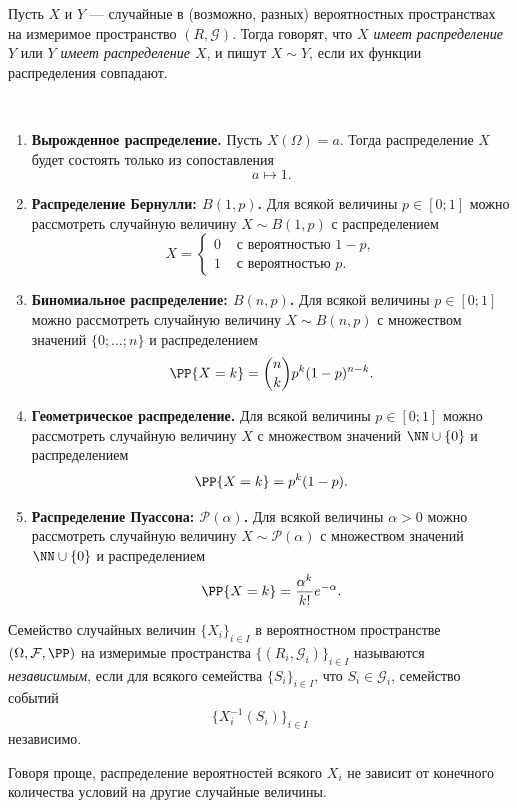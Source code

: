 \documentclass[12pt,a4paper]{article}
\begin{document}
    \begin{definition}
        Пусть $X$ и $Y$ --- случайные в (возможно, разных) вероятностных пространствах на измеримое пространство $(R, \mathcal{G})$. Тогда говорят, что \emph{$X$ имеет распределение $Y$} или \emph{$Y$ имеет распределение $X$}, и пишут $X \sim Y$, если их функции распределения совпадают.
    \end{definition}

    \begin{example}\ 
        \begin{enumerate}
            \item \textbf{Вырожденное распределение.} Пусть $X(\Omega) = a$. Тогда распределение $X$ будет состоять только из сопоставления
                \[a \mapsto 1.\]
            \item \textbf{Распределение Бернулли: $B(1, p)$.} Для всякой величины $p \in [0; 1]$ можно рассмотреть случайную величину $X \sim B(1, p)$ с распределением
                \[
                    X =
                    \begin{cases}
                        0& \text{ с вероятностью } 1-p,\\
                        1& \text{ с вероятностью } p.
                    \end{cases}
                \]
            \item \textbf{Биномиальное распределение: $B(n, p)$.} Для всякой величины $p \in [0; 1]$ можно рассмотреть случайную величину $X \sim B(n, p)$ с множеством значений $\{0; \dots; n\}$ и распределением
                \[\PP\{X = k\} = \binom{n}{k} p^k (1-p)^{n-k}.\]
            \item \textbf{Геометрическое распределение.} Для всякой величины $p \in [0; 1]$ можно рассмотреть случайную величину $X$ с множеством значений $\NN \cup \{0\}$ и распределением
                \[\PP\{X = k\} = p^k (1-p).\]
            \item \textbf{Распределение Пуассона: $\mathcal{P}(\alpha)$.} Для всякой величины $\alpha > 0$ можно рассмотреть случайную величину $X \sim \mathcal{P}(\alpha)$ с множеством значений $\NN \cup \{0\}$ и распределением
                \[\PP\{X = k\} = \frac{\alpha^k}{k!} e^{-\alpha}.\]
        \end{enumerate}
    \end{example}

    \begin{definition}
        Семейство случайных величин $\{X_i\}_{i \in I}$ в вероятностном пространстве $(\Omega, \mathcal{F}, \PP)$ на измеримые пространства $\{(R_i, \mathcal{G}_i)\}_{i \in I}$ называются \emph{независимым}, если для всякого семейства $\{S_i\}_{i \in I}$, что $S_i \in \mathcal{G}_i$, семейство событий
        \[\{X_i^{-1}(S_i)\}_{i \in I}\]
        независимо.

        Говоря проще, распределение вероятностей всякого $X_i$ не зависит от конечного количества условий на другие случайные величины.
    \end{definition}
\end{document}
